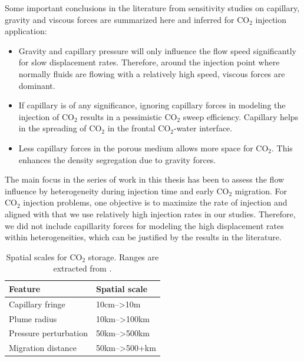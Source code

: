 Some important conclusions in the literature from sensitivity studies on
capillary, gravity and viscous forces are summarized here and inferred for
$\mbox{CO}_2$ injection application:

\begin{itemize}
 \item Gravity and capillary pressure will only influence the flow speed
significantly for slow displacement rates. Therefore, around the injection point where normally fluids are flowing with a relatively high speed, viscous forces are dominant.
 
 \item If capillary is of any significance, ignoring capillary forces in
modeling the injection of $\mbox{CO}_2$ results in a pessimistic $\mbox{CO}_2$
sweep efficiency. Capillary helps in the spreading of $\mbox{CO}_2$ in the
frontal $\mbox{CO}_2$-water interface.
 
 \item Less capillary forces in the porous medium allows more space for
$\mbox{CO}_2$. This enhances the density segregation due to gravity forces.
\end{itemize}

The main focus in the series of work in this thesis has been to assess the flow
influence by heterogeneity during injection time and early $\mbox{CO}_2$
migration. For $\mbox{CO}_2$ injection problems, one objective is to maximize
the rate of injection and aligned with that we use relatively high injection
rates in our studies. Therefore, we did not include capillarity forces for
modeling the high displacement rates within heterogeneities, which can be
justified by the results in the literature.


\begin{table}[tbf]
  \center
  \caption{Spatial scales for $\mbox{CO}_2$ storage. Ranges are extracted from
  \cite{celia2011geological}.}
  \begin{tabular}{ |l|l| }
    \hline
    Feature& Spatial scale \\
    \hline
    Capillary fringe & 10cm-->10m\\
    \hline
    Plume radius & 10km-->100km\\
    \hline
    Pressure perturbation & 50km-->500km\\
    \hline
    Migration distance & 50km-->500+km\\
    \hline
  \end{tabular}
  \label{tab:xscl}
\end{table}


